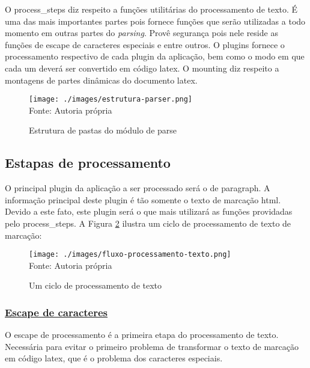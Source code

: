 O process\_steps diz respeito a funções utilitárias do processamento de texto.
É uma das mais importantes partes pois fornece funções que serão utilizadas a todo
momento em outras partes do \textit{parsing}. Provê segurança pois nele reside as funções
de escape de caracteres especiais e entre outros.
O plugins fornece o processamento respectivo de cada plugin da aplicação,
bem como o modo em que cada um deverá ser convertido em código
\acrshort{latex}.
O mounting diz respeito a montagens de partes dinâmicas do documento
\acrshort{latex}.

\begin{figure}[H]
    \centering
    \caption{Estrutura de pastas do módulo de parse}
    \texttt{[image: ./images/estrutura-parser.png]}
    \label{fig:estrutura-parser} \\
    \textnormal{\fontsize{10pt}{12pt}Fonte: Autoria própria}
\end{figure}

\subsection{Estapas de processamento}

O principal plugin da aplicação a ser processado será o de paragraph.
A informação principal deste plugin é tão somente o texto de marcação
\acrshort{html}. Devido a este fato, este plugin
será o que mais utilizará as funções providadas pelo process\_steps.
A
Figura \ref{fig:fluxo-processamento-texto}
ilustra um ciclo de processamento de texto de marcação:

\begin{figure}[H]
    \centering
    \caption{Um ciclo de processamento de texto}
    \texttt{[image: ./images/fluxo-processamento-texto.png]}
    \label{fig:fluxo-processamento-texto} \\
    \textnormal{\fontsize{10pt}{12pt}Fonte: Autoria própria}
\end{figure}



\subsubsection{\underline{Escape de caracteres}}

O escape de processamento é a primeira etapa do processamento
de texto. Necessária para evitar o primeiro problema de transformar
o texto de marcação em código
\acrshort{latex},
que é o problema dos caracteres especiais.

